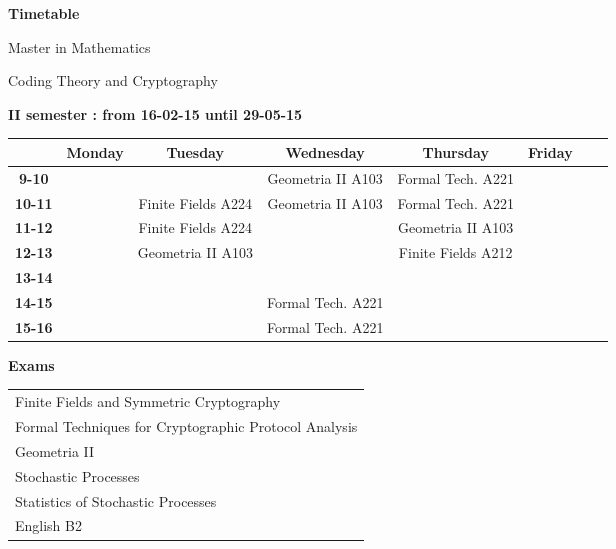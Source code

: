 \documentclass{article}
\begin{document}
\begin{landscape}

\begin{center}
\begin{huge}
	\textbf{Timetable}\\
\end{huge}
\bigskip
\begin{Large}
Master in Mathematics \\
\end{Large}
\begin{large}
Coding Theory and Cryptography\\

\end{large}
\end{center}


\begin{center}
\textbf{II semester : from 16-02-15 until 29-05-15}
\end{center}

\begin{table}[ht]
\centering
\begin{tabular}{|c|c|c|c|c|c|c|c|}\hline
& \textbf{Monday} & \textbf{Tuesday} & \textbf{Wednesday} & \textbf{Thursday} & \textbf{Friday}\\ \hline
\textbf{9-10} & & & Geometria II A103& Formal Tech. A221& \\ \hline
\textbf{10-11} & & Finite Fields A224 & Geometria II A103 & Formal Tech. A221& \\ \hline
\textbf{11-12} & & Finite Fields A224 & & Geometria II A103& \\ \hline
\textbf{12-13} & & Geometria II A103 & & Finite Fields A212 & \\ \hline
\textbf{13-14} & & & & & \\ \hline
\textbf{14-15} & & & Formal Tech. A221 & & \\ \hline
\textbf{15-16} & & & Formal Tech. A221 & & \\ \hline
\end{tabular}
\end{table}

\textbf{Exams}\\
\begin{table}[ht]
\begin{tabular}{l}
	Finite Fields and Symmetric Cryptography\\
	Formal Techniques for Cryptographic Protocol Analysis\\
	Geometria II\\
	Stochastic Processes\\
	Statistics of Stochastic Processes\\
	English B2\\
\end{tabular}
\end{table}

\end{landscape}
\end{document}

